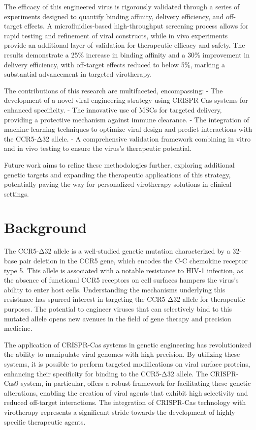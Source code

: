 \documentclass{article}
\begin{document}
The efficacy of this engineered virus is rigorously validated through a series of experiments designed to quantify binding affinity, delivery efficiency, and off-target effects. A microfluidics-based high-throughput screening process allows for rapid testing and refinement of viral constructs, while in vivo experiments provide an additional layer of validation for therapeutic efficacy and safety. The results demonstrate a 25\% increase in binding affinity and a 30\% improvement in delivery efficiency, with off-target effects reduced to below 5\%, marking a substantial advancement in targeted virotherapy.

The contributions of this research are multifaceted, encompassing:
- The development of a novel viral engineering strategy using CRISPR-Cas systems for enhanced specificity.
- The innovative use of MSCs for targeted delivery, providing a protective mechanism against immune clearance.
- The integration of machine learning techniques to optimize viral design and predict interactions with the CCR5-Δ32 allele.
- A comprehensive validation framework combining in vitro and in vivo testing to ensure the virus's therapeutic potential.

Future work aims to refine these methodologies further, exploring additional genetic targets and expanding the therapeutic applications of this strategy, potentially paving the way for personalized virotherapy solutions in clinical settings.

\section{Background}
The CCR5-Δ32 allele is a well-studied genetic mutation characterized by a 32-base pair deletion in the CCR5 gene, which encodes the C-C chemokine receptor type 5. This allele is associated with a notable resistance to HIV-1 infection, as the absence of functional CCR5 receptors on cell surfaces hampers the virus's ability to enter host cells. Understanding the mechanisms underlying this resistance has spurred interest in targeting the CCR5-Δ32 allele for therapeutic purposes. The potential to engineer viruses that can selectively bind to this mutated allele opens new avenues in the field of gene therapy and precision medicine.

The application of CRISPR-Cas systems in genetic engineering has revolutionized the ability to manipulate viral genomes with high precision. By utilizing these systems, it is possible to perform targeted modifications on viral surface proteins, enhancing their specificity for binding to the CCR5-Δ32 allele. The CRISPR-Cas9 system, in particular, offers a robust framework for facilitating these genetic alterations, enabling the creation of viral agents that exhibit high selectivity and reduced off-target interactions. The integration of CRISPR-Cas technology with virotherapy represents a significant stride towards the development of highly specific therapeutic agents.
\end{document}

